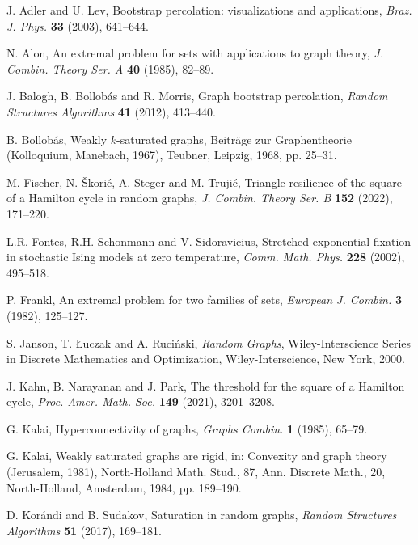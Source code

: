 \documentclass[hidelinks, 11pt]{article}
\theoremstyle{plain}
\theoremstyle{definition}
\begin{document}
\begin{thebibliography}{99}


 {\sc J. Adler} and {\sc U. Lev}, Bootstrap percolation: visualizations and applications, {\sl Braz. J. Phys.} {\bf 33} (2003), 641--644.

 {\sc  N. Alon}, An extremal problem for sets with applications to graph theory, {\sl J. Combin. Theory Ser. A}   {\bf 40} (1985), 82--89.

 {\sc  J. Balogh}, {\sc B. Bollob\'{a}s}  and  {\sc R. Morris}, Graph bootstrap percolation, {\sl Random Structures Algorithms}  {\bf 41} (2012), 413--440.

 {\sc  B. Bollob\'{a}s},   Weakly  $k$-saturated graphs, Beitr\"{a}ge zur Graphentheorie   (Kolloquium, Manebach, 1967), Teubner, Leipzig, 1968, pp. 25--31.

 {\sc M. Fischer}, {\sc N. \v Skori\'{c}}, {\sc A. Steger} and {\sc M. Truji\'{c}},  Triangle resilience of the square of a Hamilton cycle in random graphs,  {\sl J. Combin. Theory Ser. B} {\bf 152} (2022), 171--220.

 {\sc L.R. Fontes}, {\sc R.H. Schonmann} and {\sc V. Sidoravicius}, Stretched exponential fixation in stochastic Ising models at zero temperature, {\sl Comm. Math. Phys.}  {\bf 228} (2002), 495--518.

 {\sc P. Frankl}, An extremal problem for two families of sets,  {\sl European J. Combin.}  {\bf 3} (1982), 125--127.

 {\sc  S. Janson}, {\sc T. \L uczak} and {\sc A. Ruci\'{n}ski},  {\sl Random Graphs}, Wiley-Interscience Series in Discrete Mathematics and Optimization,  Wiley-Interscience, New York, 2000.

 {\sc J. Kahn}, {\sc B. Narayanan} and {\sc J. Park}, The threshold for the square of a Hamilton cycle, {\sl Proc. Amer. Math. Soc.} {\bf 149} (2021), 3201--3208.

 {\sc  G. Kalai}, Hyperconnectivity of graphs,  {\sl Graphs Combin.}   {\bf 1} (1985), 65--79.

 {\sc  G. Kalai}, Weakly saturated graphs are rigid,  in: Convexity and graph theory (Jerusalem, 1981), North-Holland Math. Stud., 87, Ann. Discrete Math., 20, North-Holland, Amsterdam, 1984, pp.  189--190.

 {\sc D. Kor\'{a}ndi} and {\sc B. Sudakov}, Saturation in random graphs, {\sl Random Structures  Algorithms}   {\bf 51} (2017),  169--181.


\end{thebibliography}
\end{document}
